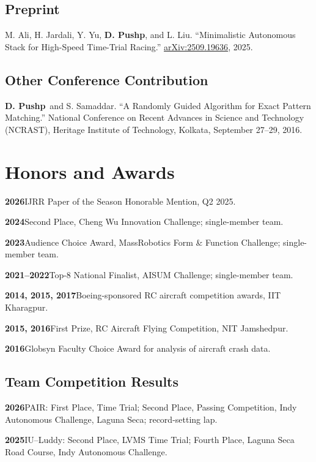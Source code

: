 \documentclass[11pt,letterpaper]{article}
\newcommand{\me}{\textbf{D. Pushp}}
\newcommand{\award}[2]{
    \textbf{#1}\quad #2\par
}
\begin{document}
\subsection{Preprint}

M. Ali, H. Jardali, Y. Yu, \me, and L. Liu.
``Minimalistic Autonomous Stack for High-Speed Time-Trial
Racing.''
\href{https://arxiv.org/abs/2509.19636}
{arXiv:2509.19636}, 2025.

\subsection{Other Conference Contribution}

\me\ and S. Samaddar.
``A Randomly Guided Algorithm for Exact Pattern Matching.''
National Conference on Recent Advances in Science and Technology
(NCRAST), Heritage Institute of Technology, Kolkata,
September 27--29, 2016.

\section{Honors and Awards}

\award{2026}
{IJRR Paper of the Season Honorable Mention, Q2 2025.}

\award{2024}
{Second Place, Cheng Wu Innovation Challenge;
single-member team.}

\award{2023}
{Audience Choice Award, MassRobotics Form \& Function
Challenge; single-member team.}

\award{2021--2022}
{Top-8 National Finalist, AISUM Challenge;
single-member team.}

\award{2014, 2015, 2017}
{Boeing-sponsored RC aircraft competition awards,
IIT Kharagpur.}

\award{2015, 2016}
{First Prize, RC Aircraft Flying Competition,
NIT Jamshedpur.}

\award{2016}
{Globsyn Faculty Choice Award for analysis of aircraft
crash data.}

\subsection{Team Competition Results}

\award{2026}
{PAIR: First Place, Time Trial; Second Place, Passing
Competition, Indy Autonomous Challenge, Laguna Seca;
record-setting lap.}

\award{2025}
{IU--Luddy: Second Place, LVMS Time Trial; Fourth Place,
Laguna Seca Road Course, Indy Autonomous Challenge.}
\end{document}
